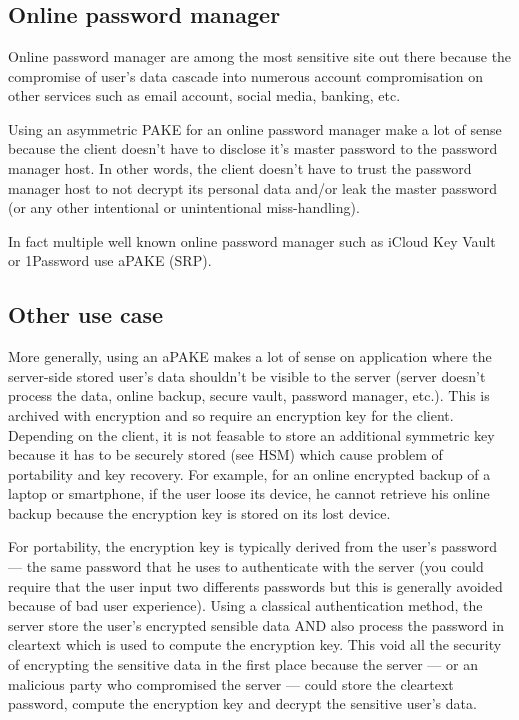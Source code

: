 \documentclass[../report.tex]{subfiles}
\begin{document}
\chapter{}
\section{Online password manager}
Online password manager are among the most sensitive site out there because the compromise of user's data cascade into numerous account compromisation on other services such as email account, social media, banking, etc.

Using an asymmetric PAKE for an online password manager make a lot of sense because the client doesn't have to disclose it's master password to the password manager host. In other words, the client doesn't have to trust the password manager host to not decrypt its personal data and/or leak the master password (or any other intentional or unintentional miss-handling).

In fact multiple well known online password manager such as iCloud Key Vault or 1Password use aPAKE (SRP).

\section{Other use case}

More generally, using an aPAKE makes a lot of sense on application where the server-side stored user's data shouldn't be visible to the server (server doesn't process the data, online backup, secure vault, password manager, etc.). This is archived with encryption and so require an encryption key for the client.
Depending on the client, it is not feasable to store an additional symmetric key because it has to be securely stored (see HSM) which cause problem of portability and key recovery. For example, for an online encrypted backup of a laptop or smartphone, if the user loose its device, he cannot retrieve his online backup because the encryption key is stored on its lost device.

For portability, the encryption key is typically derived from the user's password --- the same password that he uses to authenticate with the server (you could require that the user input two differents passwords but this is generally avoided because of bad user experience). Using a classical authentication method, the server store the user's encrypted sensible data AND also process the password in cleartext which is used to compute the encryption key. This void all the security of encrypting the sensitive data in the first place because the server --- or an malicious party who compromised the server --- could store the cleartext password, compute the encryption key and decrypt the sensitive user's data.
\end{document}
